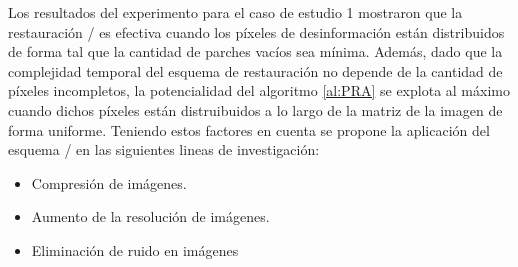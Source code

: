 Los resultados del experimento para el caso de estudio 1 mostraron que la restauraci\'on \SOP/ es efectiva cuando los p\'ixeles de desinformaci\'on est\'an distribuidos de forma tal que la cantidad de parches vac\'ios sea m\'inima. Adem\'as, dado que la complejidad temporal del esquema de restauraci\'on no depende de la cantidad de p\'ixeles incompletos, la potencialidad del algoritmo \ref{al:PRA} se explota al m\'aximo cuando dichos p\'ixeles están distruibuidos a lo largo de la matriz de la imagen de forma uniforme. Teniendo estos factores en cuenta se propone la aplicaci\'on del esquema \SOP/ en las siguientes lineas de investigaci\'on:
\begin{itemize}
	\item Compresi\'on de im\'agenes.
	\item Aumento de la resoluci\'on de im\'agenes.
	\item Eliminaci\'on de ruido en im\'agenes 
\end{itemize}

